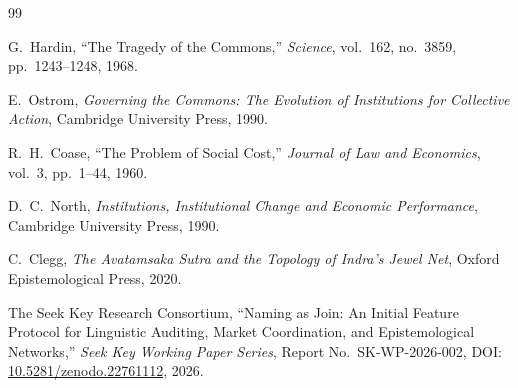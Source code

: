 \documentclass[11pt,a4paper]{article}
\begin{document}
\vspace{2em}
\begin{thebibliography}{99}

G.~Hardin, ``The Tragedy of the Commons,'' \emph{Science}, vol.~162, no.~3859, pp.~1243--1248, 1968.

E.~Ostrom, \emph{Governing the Commons: The Evolution of Institutions for Collective Action}, Cambridge University Press, 1990.

R.~H.~Coase, ``The Problem of Social Cost,'' \emph{Journal of Law and Economics}, vol.~3, pp.~1--44, 1960.

D.~C.~North, \emph{Institutions, Institutional Change and Economic Performance}, Cambridge University Press, 1990.

C.~Clegg, \emph{The Avatamsaka Sutra and the Topology of Indra's Jewel Net}, Oxford Epistemological Press, 2020.

The Seek Key Research Consortium, ``Naming as Join: An Initial Feature Protocol for Linguistic Auditing, Market Coordination, and Epistemological Networks,'' \emph{Seek Key Working Paper Series}, Report No.~SK-WP-2026-002, DOI: \href{https://doi.org/10.5281/zenodo.22761112}{10.5281/zenodo.22761112}, 2026.

\end{thebibliography}
\end{document}
